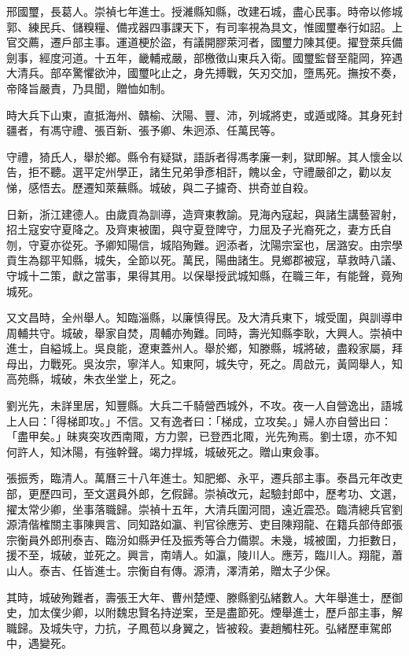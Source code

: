 \begin{pinyinscope}
邢國璽，長葛人。崇禎七年進士。授濰縣知縣，改建石城，盡心民事。時帝以修城郭、練民兵、儲糗糧、備戎器四事課天下，有司率視為具文，惟國璽奉行如詔。上官交薦，遷戶部主事。運道梗於盜，有議開膠萊河者，國璽力陳其便。擢登萊兵備劍事，經度河道。十五年，畿輔戒嚴，部檄徵山東兵入衛。國璽監督至龍岡，猝遇大清兵。部卒驚懼欲沖，國璽叱止之，身先搏戰，矢刃交加，墮馬死。撫按不奏，帝降旨嚴責，乃具聞，贈恤如制。

時大兵下山東，直抵海州、贛榆、汱陽、豐、沛，列城將吏，或遁或降。其身死封疆者，有馮守禮、張百新、張予卿、朱迥添、任萬民等。

守禮，猗氏人，舉於鄉。縣令有疑獄，語訴者得馮孝廉一剌，獄即解。其人懷金以告，拒不聽。選平定州學正，諸生兄弟爭彥相訐，餽以金，守禮嚴卻之，勸以友悌，感悟去。歷遷知萊蕪縣。城破，與二子攄奇、拱奇並自殺。

日新，浙江建德人。由歲貢為訓導，造齊東教諭。見海內寇起，與諸生講藝習射，招土寇安守夏降之。及齊東被圍，與守夏登陴守，力屈及子光裔死之，妻方氏自刎，守夏亦從死。予卿知陽信，城陷殉難。迥添者，沈陽宗室也，居潞安。由宗學貢生為鄒平知縣，城失，全節以死。萬民，陽曲諸生。見鄉郡被寇，草救時八議、守城十二策，獻之當事，果得其用。以保舉授武城知縣，在職三年，有能聲，竟殉城死。

又文昌時，全州舉人。知臨淄縣，以廉慎得民。及大清兵東下，城受圍，與訓導申周輔共守。城破，舉家自焚，周輔亦殉難。同時，壽光知縣李耿，大興人。崇禎中進士，自縊城上。吳良能，遼東蓋州人。舉於鄉，知滕縣，城將破，盡殺家屬，拜母出，力戰死。吳汝宗，寧洋人。知東阿，城失守，死之。周啟元，黃岡舉人，知高苑縣，城破，朱衣坐堂上，死之。

劉光先，未詳里居，知豐縣。大兵二千騎營西城外，不攻。夜一人自營逸出，語城上人曰：「得梯即攻。」不信。又有逸者曰：「梯成，立攻矣。」婦人亦自營出曰：「盡甲矣。」昧爽突攻西南陬，方力禦，已登西北陬，光先殉焉。劉士璟，亦不知何許人，知沐陽，有強幹聲。竭力捍城，城破死之。贈山東僉事。

張振秀，臨清人。萬曆三十八年進士。知肥鄉、永平，遷兵部主事。泰昌元年改吏部，更歷四司，至文選員外郎，乞假歸。崇禎改元，起驗封郎中，歷考功、文選，擢太常少卿，坐事落職歸。崇禎十五年，大清兵圍河間，遠近震恐。臨清總兵官劉源清偕榷關主事陳興言、同知路如瀛、判官徐應芳、吏目陳翔龍、在籍兵部侍郎張宗衡員外郎刑泰吉、臨汾如縣尹任及振秀等合力備禦。未幾，城被圍，力拒數日，援不至，城破，並死之。興言，南靖人。如瀛，陵川人。應芳，臨川人。翔龍，蕭山人。泰吉、任皆進士。宗衡自有傳。源清，澤清弟，贈太子少保。

其時，城破殉難者，壽張王大年、曹州楚煙、滕縣劉弘緒數人。大年舉進士，歷御史，加太僕少卿，以附魏忠賢名持逆案，至是盡節死。煙舉進士，歷戶部主事，解職歸。及城失守，力抗，子鳳苞以身翼之，皆被殺。妻趙觸柱死。弘緒歷車駕郎中，遇變死。


\end{pinyinscope}
